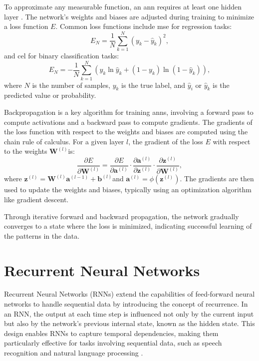\documentclass[12pt, a4paper, headinclude, twoside, plainheadsepline, open=right, numbers=noenddot, hidelinks, toc=listof, toc=bibliography]{scrreprt}
\begin{document}
To approximate any measurable function, an \ac{ann} requires at least one hidden layer \cite{hornikMultilayerFeedforwardNetworks1989}. 
The network's weights and biases are adjusted during training to minimize a loss function $E$. Common loss functions include \ac{mse} for regression tasks:
\begin{equation}
E_N = \frac{1}{N} \sum_{k=1}^{N}(y_{k} - \hat{y}_{k})^2,
\end{equation}
and \ac{cel} for binary classification tasks:
\begin{equation}
E_N = -\frac{1}{N} \sum_{k=1}^{N} \left( y_k \ln{\hat{y}_k} + (1-y_k) \ln{(1-\hat{y}_k)} \right),
\end{equation}
where $N$ is the number of samples, $y_k$ is the true label, and $\hat{y}_i$ or $\hat{y}_k$ is the predicted value or probability.

Backpropagation is a key algorithm for training \acp{ann}, involving a forward pass to compute activations and a backward pass to compute gradients. 
The gradients of the loss function with respect to the weights and biases are computed using the chain rule of calculus. For a given layer $l$, the gradient of the loss $E$ with respect to the weights $\mathbf{W}^{(l)}$is:
\begin{equation}
\frac{\partial E}{\partial \mathbf{W}^{(l)}} = \frac{\partial E}{\partial \mathbf{a}^{(l)}} \cdot \frac{\partial \mathbf{a}^{(l)}}{\partial \mathbf{z}^{(l)}} \cdot \frac{\partial \mathbf{z}^{(l)}}{\partial \mathbf{W}^{(l)}},
\end{equation}
where $\mathbf{z}^{(l)} = \mathbf{W}^{(l)} \mathbf{a}^{(l-1)} + \mathbf{b}^{(l)}$and $\mathbf{a}^{(l)} = \phi(\mathbf{z}^{(l)})$. 
The gradients are then used to update the weights and biases, typically using an optimization algorithm like gradient descent.

Through iterative forward and backward propagation, the network gradually converges to a state where the loss is minimized, indicating successful learning of the patterns in the data.

\section{Recurrent Neural Networks}
\label{sec:rnn}

Recurrent Neural Networks (RNNs) extend the capabilities of feed-forward neural networks to handle sequential data by introducing the concept of recurrence. In an RNN, the output at each time step is influenced not only by the current input but also by the network's previous internal state, known as the hidden state. This design enables RNNs to capture temporal dependencies, making them particularly effective for tasks involving sequential data, such as speech recognition and natural language processing \cite{lecunDeepLearning2015}.
\end{document}
